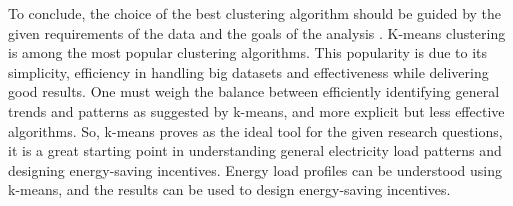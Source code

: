 To conclude, the choice of the best clustering algorithm should be guided by the given requirements of the data and the goals of the analysis \cite{COL-ALT}.
K-means clustering is among the most popular clustering algorithms.
This popularity is due to its simplicity, efficiency in handling big datasets and effectiveness while delivering good results.
One must weigh the balance between efficiently identifying general trends and patterns as suggested by k-means, and more explicit but less effective algorithms.
So, k-means proves as the ideal tool for the given research questions, it is a great starting point in understanding general electricity load patterns and designing energy-saving incentives.
Energy load profiles can be understood using k-means, and the results can be used to design energy-saving incentives.
